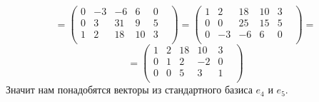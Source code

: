 \documentclass[a4paper,12pt]{article}
\begin{document}
\[
=
\begin{pmatrix}
0 & -3 & -6 & 6 & 0 & \\
0 & 3 & 31 & 9 & 5 & \\
1 & 2 & 18 & 10 & 3 & \\
\end{pmatrix}
=
\begin{pmatrix}
1 & 2 & 18 & 10 & 3 & \\
0 & 0 & 25 & 15 & 5 & \\
0 & -3 & -6 & 6 & 0 & \\
\end{pmatrix}
=
\]
\[
=
\begin{pmatrix}
1 & 2 & 18 & 10 & 3 & \\
0 & 1 & 2 & -2 & 0 & \\
0 & 0 & 5 & 3 & 1 & \\
\end{pmatrix}
\]
Значит нам понадобятся векторы из стандартного базиса $e_4$ и $e_5$.
\\\\
\end{document}
